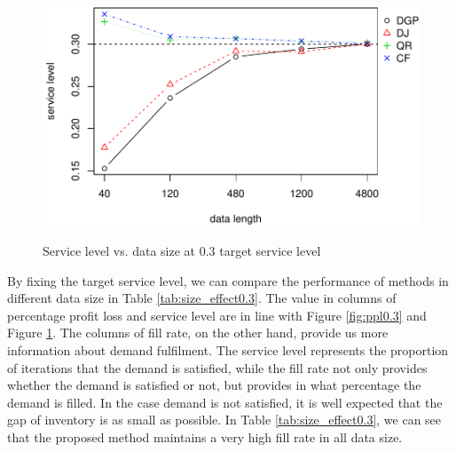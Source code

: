 \documentclass{article}
\begin{document}
\begin{figure}[ht]
\centering
\caption{Service level vs. data size at 0.3 target service level}
\includegraphics{sl-3.pdf}
\label{fig:sl0.3}
\end{figure}

By fixing the target service level, we can compare the performance of methods in different data size in Table \ref{tab:size_effect0.3}. The value in columns of percentage profit loss and service level are in line with Figure \ref{fig:ppl0.3} and Figure \ref{fig:sl0.3}. The columns of fill rate, on the other hand, provide us more information about demand fulfilment. The service level represents the proportion of iterations that the demand is satisfied, while the fill rate not only provides whether the demand is satisfied or not, but provides in what percentage the demand is filled. In the case demand is not satisfied, it is well expected that the gap of inventory is as small as possible. In Table \ref{tab:size_effect0.3}, we can see that the proposed method maintains a very high fill rate in all data size. 
\end{document}
